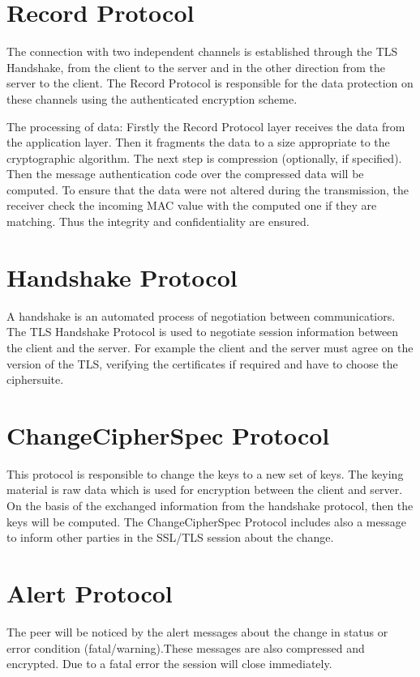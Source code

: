 \section{Record Protocol}
\label{sec:record_protocol}

The connection with two independent channels is established through the TLS Handshake, from the client to the server and in the other direction from the server to the client. The Record Protocol is responsible for the data protection on these channels using the authenticated encryption scheme.

The processing of data:              
Firstly the Record Protocol layer receives the data from the application layer. Then it fragments the data to a size appropriate to the cryptographic algorithm. 
The next step is compression (optionally, if specified). Then the message authentication code over the compressed data will be computed.
To ensure that the data were not altered during the transmission, the receiver check the incoming MAC value with the computed one if they are matching. Thus the integrity and confidentiality are ensured.
\cite{ms:Record}

\section{Handshake Protocol}
\label{sec:handshake_protocol}
 A handshake is an automated process of negotiation between communicatiors. The TLS Handshake Protocol is used to negotiate session information between the client and the server. For example the client and the server must agree on the version of the TLS, verifying the certificates if required and have to choose the ciphersuite. 

\cite{ms:overview}
\cite{ms:handshake}

\section{ChangeCipherSpec Protocol}
\label{sec:changeciphfer_protocol}
This protocol is responsible to change the keys to a new set of keys. 
The keying material is raw data which is used for encryption between the client and server. On the basis of the exchanged information from the handshake protocol, then the keys will be computed.
The ChangeCipherSpec Protocol includes also a message to inform other parties in the SSL/TLS session about the change.   \cite{ms:overview}


\section{Alert Protocol}
\label{sec:alert_protocol}
The peer will be noticed by the alert messages about the change in status or error condition (fatal/warning).These messages are also compressed and encrypted. Due to a fatal error the session will close immediately. 

